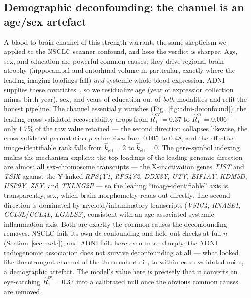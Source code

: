 \documentclass{article}
\begin{document}
\subsection{Demographic deconfounding: the channel is an age/sex artefact}
\label{sec:adni-deconfound}
A blood-to-brain channel of this strength warrants the same skepticism we
applied to the NSCLC scanner confound, and here the verdict is sharper. Age,
sex, and education are powerful common causes: they drive regional brain atrophy
(hippocampal and entorhinal volume in particular, exactly where the leading
imaging loadings fall) \emph{and} systemic whole-blood expression. ADNI supplies
these covariates~\citep{petersen2010adni}, so we residualize age (year of
expression collection minus birth year), sex, and years of education out of
\emph{both} modalities and refit the honest pipeline. The channel essentially
vanishes (Fig.~\ref{fig:adni-deconfound}): the leading cross-validated
recoverability drops from $\hat R_1^{\mathrm{cv}} = 0.37$ to
$\hat R_1^{\mathrm{cv}} = 0.006$ --- only $1.7\%$ of the raw value retained ---
the second direction collapses likewise, the cross-validated permutation
$p$-value rises from $0.005$ to $0.48$, and the effective image-identifiable
rank falls from $\hat k_{\mathrm{eff}} = 2$ to $\hat k_{\mathrm{eff}} = 0$.
The gene-symbol indexing makes the mechanism explicit: the top loadings of the
leading genomic direction are almost all sex-chromosome transcripts --- the
X-inactivation genes \emph{XIST} and \emph{TSIX} against the Y-linked
\emph{RPS4Y1}, \emph{RPS4Y2}, \emph{DDX3Y}, \emph{UTY}, \emph{EIF1AY},
\emph{KDM5D}, \emph{USP9Y}, \emph{ZFY}, and \emph{TXLNG2P} --- so the leading
``image-identifiable'' axis is, transparently, sex, which brain morphometry
reads out directly. The second direction is dominated by myeloid/inflammatory
transcripts (\emph{VSIG4}, \emph{RNASE1}, \emph{CCL3L}/\emph{CCL4L},
\emph{LGALS2}), consistent with an age-associated systemic-inflammation axis.
Both are exactly the common causes the deconfounding removes.
NSCLC fails its own de-confounding and held-out checks at full $n$
(Section~\ref{sec:nsclc}), and ADNI fails here even more sharply: the ADNI
radiogenomic association does not survive deconfounding at all --- what looked
like the strongest channel of the three cohorts is, to within cross-validated
noise, a demographic artefact. The model's value here is precisely that it converts an eye-catching
$\hat R_1^{\mathrm{cv}} = 0.37$ into a calibrated null once the obvious common
causes are removed.
\end{document}
